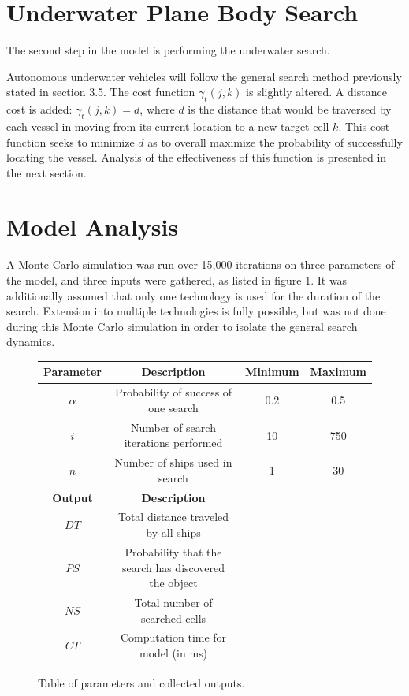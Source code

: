 \documentclass[a4paper]{article}
\begin{document}
\section{Underwater Plane Body Search}
The second step in the model is performing the underwater search. 

Autonomous underwater vehicles will follow the general search method previously stated in section 3.5. The cost function $\gamma_t(j,k)$ is slightly altered. A distance cost is added: $\gamma_t(j,k)=d$, where $d$ is the distance that would be traversed by each vessel in moving from its current location to a new target cell $k$. This cost function seeks to minimize $d$ as to overall maximize the probability of successfully locating the vessel. Analysis of the effectiveness of this function is presented in the next section.

\section{Model Analysis}

A Monte Carlo simulation was run over 15,000 iterations on three parameters of the model, and three inputs were gathered, as listed in figure 1. It was additionally assumed that only one technology is used for the duration of the search. Extension into multiple technologies is fully possible, but was not done during this Monte Carlo simulation in order to isolate the general search dynamics.

\begin{figure}[H]\begin{center}\begin{tabular}{|c|c|c|c|}
\hline \textbf{Parameter} & \textbf{Description} & \textbf{Minimum} & \textbf{Maximum}\\\hline\hline
$\alpha$ & Probability of success of one search & 0.2 & 0.5 \\\hline
$i$ & Number of search iterations performed & 10 & 750 \\\hline
$n$ & Number of ships used in search & 1 & 30 \\\hline\hline
\textbf{Output} & \textbf{Description} &&\\\hline
$DT$ & Total distance traveled by all ships &&\\\hline
$PS$ & Probability that the search has discovered the object &&\\\hline
$NS$ & Total number of searched cells &&\\\hline
$CT$ & Computation time for model (in ms) &&\\\hline
\end{tabular}\end{center}
\caption{Table of parameters and collected outputs.}
\end{figure}
\end{document}
